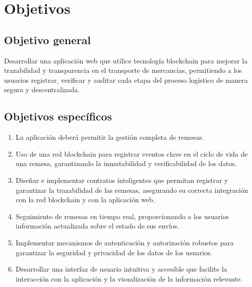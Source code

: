 \section{Objetivos}
\subsection{Objetivo general}
Desarrollar una aplicación web que utilice tecnología blockchain para mejorar la trazabilidad y transparencia en 
el transporte de mercancías, permitiendo a los usuarios registrar, verificar y auditar cada etapa del proceso logístico de
manera segura y descentralizada.

\subsection{Objetivos específicos}
\begin{enumerate}
    \item La aplicación deberá permitir la gestión completa de remesas.
    \item Uso de una red blockchain para registrar eventos clave en el ciclo de vida de una remesa, garantizando la inmutabilidad y verificabilidad de los datos.
    \item Diseñar e implementar contratos inteligentes que permitan registrar y garantizar la trazabilidad de las remesas, asegurando su correcta integración con la red blockchain y con la aplicación web.
    \item Seguimiento de remesas en tiempo real, proporcionando a los usuarios información actualizada sobre el estado de sus envíos.
    \item Implementar mecanismos de autenticación y autorización robustos para garantizar la seguridad y privacidad de los datos de los usuarios.
    \item Desarrollar una interfaz de usuario intuitiva y accesible que facilite la interacción con la aplicación y la visualización de la información relevante.
\end{enumerate}

